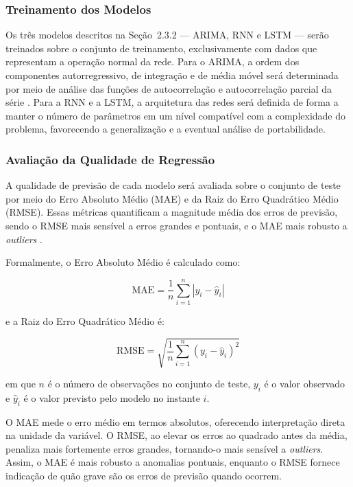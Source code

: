 \subsubsection{Treinamento dos Modelos}

Os três modelos descritos na Seção~2.3.2 — ARIMA, RNN e LSTM — serão 
treinados sobre o conjunto de treinamento, exclusivamente com dados que 
representam a operação normal da rede. Para o ARIMA, a ordem dos componentes 
autorregressivo, de integração e de média móvel será determinada por meio de 
análise das funções de autocorrelação e autocorrelação parcial da série 
\cite{box2015}. Para a RNN e a LSTM, a arquitetura das redes será definida 
de forma a manter o número de parâmetros em um nível compatível com a 
complexidade do problema, favorecendo a generalização e a eventual análise 
de portabilidade.


\subsubsection{Avaliação da Qualidade de Regressão}

A qualidade de previsão de cada modelo será avaliada sobre o conjunto de 
teste por meio do Erro Absoluto Médio (MAE) e da Raiz do Erro Quadrático 
Médio (RMSE). Essas métricas quantificam a magnitude média dos erros de 
previsão, sendo o RMSE mais sensível a erros grandes e pontuais, e o MAE 
mais robusto a \textit{outliers} \cite{hyndman2021}.


Formalmente, o Erro Absoluto Médio é calculado como:

\[
\mathrm{MAE} = \frac{1}{n} \sum_{i=1}^{n} |y_i - \hat{y}_i|
\]

e a Raiz do Erro Quadrático Médio é:

\[
\mathrm{RMSE} = \sqrt{\frac{1}{n} \sum_{i=1}^{n} (y_i - \hat{y}_i)^2}
\]

em que $n$ é o número de observações no conjunto de teste, $y_i$ é o 
valor observado e $\hat{y}_i$ é o valor previsto pelo modelo no instante $i$.

O MAE mede o erro médio em termos absolutos, oferecendo interpretação 
direta na unidade da variável. O RMSE, ao elevar os erros ao quadrado 
antes da média, penaliza mais fortemente erros grandes, tornando-o mais 
sensível a \textit{outliers}. Assim, o MAE é mais robusto a anomalias 
pontuais, enquanto o RMSE fornece indicação de quão grave são os erros 
de previsão quando ocorrem.

